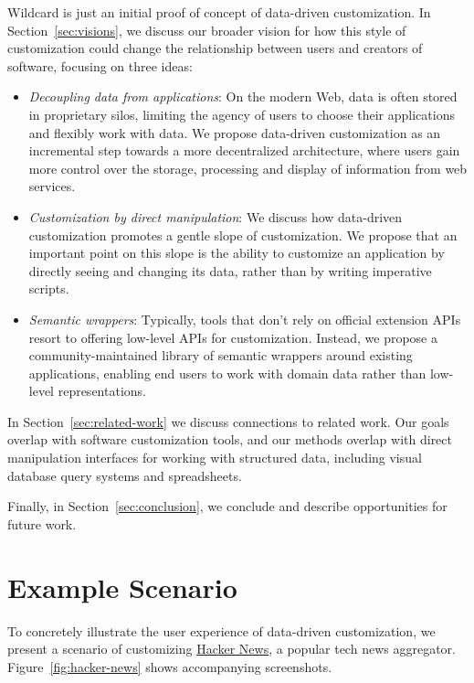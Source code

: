 \documentclass[sigplan,screen,10pt,anonymous,review]{acmart}
\providecommand{\tightlist}{%
  \setlength{\itemsep}{0pt}\setlength{\parskip}{0pt}}
\begin{document}
Wildcard is just an initial proof of concept of data-driven
customization. In Section~\ref{sec:visions}, we discuss our broader
vision for how this style of customization could change the relationship
between users and creators of software, focusing on three ideas:

\begin{itemize}
\tightlist
\item
  \emph{Decoupling data from applications}: On the modern Web, data is
  often stored in proprietary silos, limiting the agency of users to
  choose their applications and flexibly work with data. We propose
  data-driven customization as an incremental step towards a more
  decentralized architecture, where users gain more control over the
  storage, processing and display of information from web services.
\item
  \emph{Customization by direct manipulation}: We discuss how
  data-driven customization promotes a gentle slope of customization. We
  propose that an important point on this slope is the ability to
  customize an application by directly seeing and changing its data,
  rather than by writing imperative scripts.
\item
  \emph{Semantic wrappers}: Typically, tools that don't rely on official
  extension APIs resort to offering low-level APIs for customization.
  Instead, we propose a community-maintained library of semantic
  wrappers around existing applications, enabling end users to work with
  domain data rather than low-level representations.
\end{itemize}

In Section~\ref{sec:related-work} we discuss connections to related
work. Our goals overlap with software customization tools, and our
methods overlap with direct manipulation interfaces for working with
structured data, including visual database query systems and
spreadsheets.

Finally, in Section~\ref{sec:conclusion}, we conclude and describe
opportunities for future work.

\hypertarget{sec:example}{%
\section{Example Scenario}\label{sec:example}}

To concretely illustrate the user experience of data-driven
customization, we present a scenario of customizing
\href{https://news.ycombinator.com/}{Hacker News}, a popular tech news
aggregator. Figure~\ref{fig:hacker-news} shows accompanying screenshots.
\end{document}
